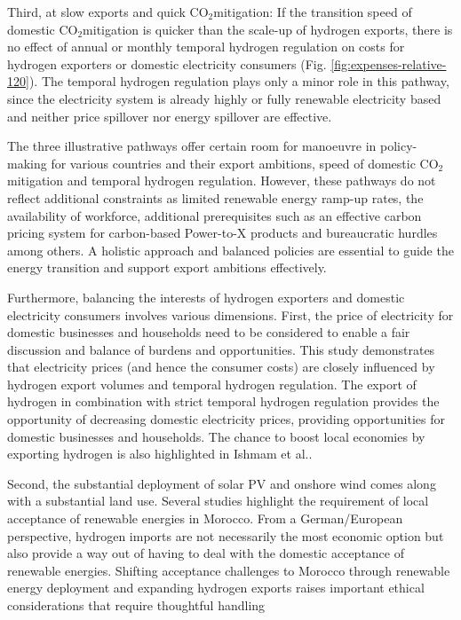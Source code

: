 \documentclass[5p,numafflabel]{elsarticle}
\newcommand{\co}{\ce{CO2}~}
\def\co{CO${}_2${\:}}
\begin{document}
Third, at slow exports and quick \co mitigation: If the transition speed of domestic \co mitigation is quicker than the scale-up of hydrogen exports, there is no effect of annual or monthly temporal hydrogen regulation on costs for hydrogen exporters or domestic electricity consumers (Fig. \ref{fig:expenses-relative-120}). The temporal hydrogen regulation plays only a minor role in this pathway, since the electricity system is already highly or fully renewable electricity based and neither price spillover nor energy spillover are effective.

The three illustrative pathways offer certain room for manoeuvre in policy-making for various countries and their export ambitions, speed of domestic \co mitigation and temporal hydrogen regulation. However, these pathways do not reflect additional constraints as limited renewable energy ramp-up rates, the availability of workforce, additional prerequisites such as an effective carbon pricing system for carbon-based Power-to-X products and bureaucratic hurdles among others. 
A holistic approach and balanced policies are essential to guide the energy transition and support export ambitions effectively.


Furthermore, balancing the interests of hydrogen exporters and domestic electricity consumers involves various dimensions.
First, the price of electricity for domestic businesses and households need to be considered to enable a fair discussion and balance of burdens and opportunities. 
This study demonstrates that electricity prices (and hence the consumer costs) are closely influenced by hydrogen export volumes and temporal hydrogen regulation. 
The export of hydrogen in combination with strict temporal hydrogen regulation provides the opportunity of decreasing domestic electricity prices, providing opportunities for domestic businesses and households. The chance to boost local economies by exporting hydrogen is also highlighted in Ishmam et al.\cite{Ishmam2024}.

Second, the substantial deployment of solar PV and onshore wind comes along with a substantial land use. Several studies \cite{Terrapon-Pfaff2019, Hanger2016} highlight the requirement of local acceptance of renewable energies in Morocco. From a German/European perspective, hydrogen imports are not necessarily the most economic option \cite{Merten2023} but also provide a way out of having to deal with the domestic acceptance of renewable energies.
Shifting acceptance challenges to Morocco through renewable energy deployment and expanding hydrogen exports raises important ethical considerations that require thoughtful handling
\end{document}
